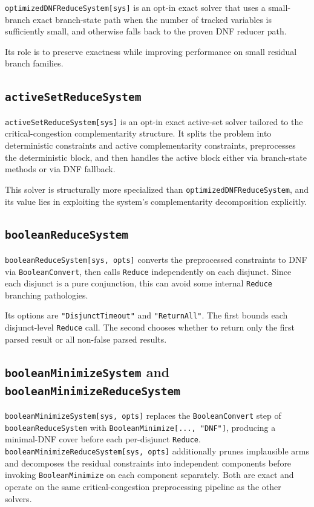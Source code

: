 \documentclass[11pt]{article}
\begin{document}
\texttt{optimizedDNFReduceSystem[sys]} is an opt-in exact solver that uses a small-branch exact branch-state path when the number of tracked variables is sufficiently small, and otherwise falls back to the proven DNF reducer path.

Its role is to preserve exactness while improving performance on small residual branch families.

\subsection*{\texttt{activeSetReduceSystem}}

\texttt{activeSetReduceSystem[sys]} is an opt-in exact active-set solver tailored to the critical-congestion complementarity structure. It splits the problem into deterministic constraints and active complementarity constraints, preprocesses the deterministic block, and then handles the active block either via branch-state methods or via DNF fallback.

This solver is structurally more specialized than \texttt{optimizedDNFReduceSystem}, and its value lies in exploiting the system's complementarity decomposition explicitly.

\subsection*{\texttt{booleanReduceSystem}}

\texttt{booleanReduceSystem[sys, opts]} converts the preprocessed constraints to DNF via \texttt{BooleanConvert}, then calls \texttt{Reduce} independently on each disjunct. Since each disjunct is a pure conjunction, this can avoid some internal \texttt{Reduce} branching pathologies.

Its options are \texttt{"DisjunctTimeout"} and \texttt{"ReturnAll"}. The first bounds each disjunct-level \texttt{Reduce} call. The second chooses whether to return only the first parsed result or all non-false parsed results.

\subsection*{\texttt{booleanMinimizeSystem} and \texttt{booleanMinimizeReduceSystem}}

\texttt{booleanMinimizeSystem[sys, opts]} replaces the \texttt{BooleanConvert} step of \texttt{booleanReduceSystem} with \texttt{BooleanMinimize[..., "DNF"]}, producing a minimal-DNF cover before each per-disjunct \texttt{Reduce}. \texttt{booleanMinimizeReduceSystem[sys, opts]} additionally prunes implausible arms and decomposes the residual constraints into independent components before invoking \texttt{BooleanMinimize} on each component separately. Both are exact and operate on the same critical-congestion preprocessing pipeline as the other solvers.
\end{document}

